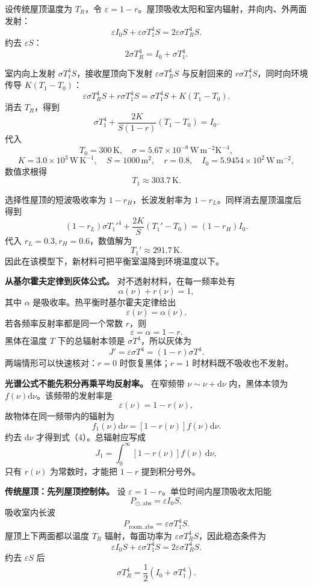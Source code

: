 \documentclass[12pt,a4paper,UTF8]{ctexart}
\begin{document}
设传统屋顶温度为 \(T_R\)，令
\(\varepsilon=1-r\)。屋顶吸收太阳和室内辐射，并向内、外两面发射： \[
\varepsilon I_0S+\varepsilon\sigma T_1^4S
=2\varepsilon\sigma T_R^4S. \tag{5}
\] 约去 \(\varepsilon S\)： \[
2\sigma T_R^4=I_0+\sigma T_1^4. \tag{6}
\]

室内向上发射 \(\sigma T_1^4S\)，接收屋顶向下发射
\(\varepsilon\sigma T_R^4S\) 与反射回来的
\(r\sigma T_1^4S\)，同时向环境传导 \(K(T_1-T_0)\)： \[
\varepsilon\sigma T_R^4S+r\sigma T_1^4S
=\sigma T_1^4S+K(T_1-T_0). \tag{7}
\] 消去 \(T_R\)，得到 \[
\boxed{
\sigma T_1^4+
\frac{2K}{S(1-r)}(T_1-T_0)=I_0
}. \tag{8}
\] 代入 \[
T_0=300\,\mathrm K,\quad
\sigma=5.67\times10^{-8}\,\mathrm{W\,m^{-2}K^{-4}},
\] \[
K=3.0\times10^3\,\mathrm{W\,K^{-1}},\quad
S=1000\,\mathrm{m^2},\quad r=0.8,\quad
I_0=5.9454\times10^2\,\mathrm{W\,m^{-2}},
\] 数值求根得 \[
\boxed{T_1\approx303.7\,\mathrm K}. \tag{9}
\]

选择性屋顶的短波吸收率为 \(1-r_H\)，长波发射率为
\(1-r_L\)。同样消去屋顶温度后得到 \[
\boxed{
(1-r_L)\sigma T_1'^4+
\frac{2K}{S}(T_1'-T_0)
=(1-r_H)I_0
}. \tag{10}
\] 代入 \(r_L=0.3,r_H=0.6\)，数值解为 \[
\boxed{T_1'\approx291.7\,\mathrm K}. \tag{11}
\] 因此在该模型下，新材料可把平衡室温降到环境温度以下。

\textbf{从基尔霍夫定律到灰体公式。} 对不透射材料，在每一频率处有 \[
\alpha(\nu)+r(\nu)=1,
\] 其中 \(\alpha\) 是吸收率。热平衡时基尔霍夫定律给出 \[
\varepsilon(\nu)=\alpha(\nu).
\] 若各频率反射率都是同一个常数 \(r\)，则 \[
\varepsilon=\alpha=1-r.
\] 黑体在温度 \(T\) 下的总辐射本领是 \(\sigma T^4\)，所以灰体为 \[
J'=\varepsilon\sigma T^4=(1-r)\sigma T^4.
\] 两端情形可以快速核对：\(r=0\) 时恢复黑体；\(r=1\)
时材料既不吸收也不发射。

\textbf{光谱公式不能先积分再乘平均反射率。} 在窄频带
\(\nu\sim\nu+\mathrm d\nu\) 内，黑体本领为
\(f(\nu)\mathrm d\nu\)。该频带的发射率是 \[
\varepsilon(\nu)=1-r(\nu),
\] 故物体在同一频带内的辐射为 \[
f_1(\nu)\mathrm d\nu
=[1-r(\nu)]f(\nu)\mathrm d\nu.
\] 约去 \(\mathrm d\nu\) 才得到式（4）。总辐射应写成 \[
J_1=\int_0^\infty[1-r(\nu)]f(\nu)\,\mathrm d\nu,
\] 只有 \(r(\nu)\) 为常数时，才能把 \(1-r\) 提到积分号外。

\textbf{传统屋顶：先列屋顶控制体。} 设
\(\varepsilon=1-r\)。单位时间内屋顶吸收太阳能 \[
P_{\odot,\mathrm{abs}}=\varepsilon I_0S,
\] 吸收室内长波 \[
P_{\mathrm{room},\mathrm{abs}}
=\varepsilon\sigma T_1^4S.
\] 屋顶上下两面都以温度 \(T_R\) 辐射，每面功率为
\(\varepsilon\sigma T_R^4S\)，因此稳态条件为 \[
\varepsilon I_0S+\varepsilon\sigma T_1^4S
=2\varepsilon\sigma T_R^4S.
\] 约去 \(\varepsilon S\) 后 \[
\sigma T_R^4=\frac12\left(I_0+\sigma T_1^4\right).
\]
\end{document}
